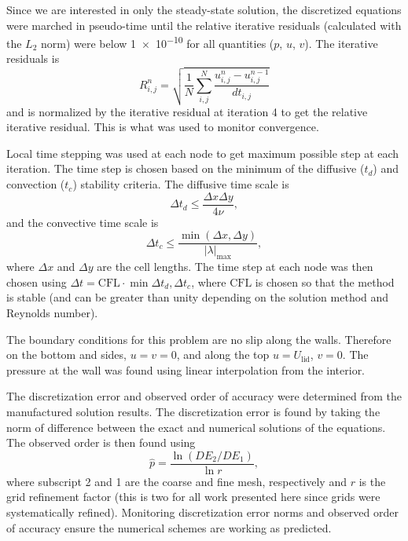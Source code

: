 \documentclass[10pt, letterpaper]{article}
\begin{document}
Since we are interested in only the steady-state solution, the discretized equations
were marched in pseudo-time until the relative iterative residuals (calculated
with the $L_2$ norm) were below \num{1e-10} for all quantities ($p$, $u$, $v$).
The iterative residuals is
%
\begin{equation} \label{eqn:resid}
	R_{i,j}^n = \sqrt{\frac{1}{N} \sum_{i,j}^N 
		\frac{u_{i,j}^n - u_{i,j}^{n-1}}{dt_{i,j}}}
\end{equation}
%
and is normalized by the iterative residual at iteration 4 to get the relative
iterative residual.  This is what was used to monitor convergence.

Local time stepping was used at each node to get maximum possible step at
each iteration.  The time step is chosen based on the minimum of the
diffusive ($t_d$) and convection ($t_c$) stability criteria.  The diffusive
time scale is
%
\begin{equation*}
	\Delta t_d \leq \frac{\Delta x \Delta y}{4 \nu},
\end{equation*}
%
and the convective time scale is
\begin{equation*}
	\Delta t_c \leq \frac{\min(\Delta x, \Delta y)}{|\lambda|_\mathrm{max}},
\end{equation*}
%
where $\Delta x$ and $\Delta y$ are the cell lengths.  The time step at each node
was then chosen using $\Delta	 t = \mathrm{CFL} \cdot \min{\Delta t_d, \Delta t_c}$,
where $\mathrm{CFL}$ is chosen so that the method is stable (and can be greater
than unity depending on the solution method and Reynolds number).

The boundary conditions for this problem are no slip along the walls.  Therefore
on the bottom and sides, $u=v=0$, and along the top $u=U_\mathrm{lid}$, $v=0$.
The pressure at the wall was found using linear interpolation from the
interior.

The discretization error and observed order of accuracy were determined from
the manufactured solution results.  The discretization error is found by
taking the norm of difference between the exact and numerical solutions of
the equations.  The observed order is then found using
%
\begin{equation} \label{eqn:ooa}
	\hat{p} = \frac{\ln(DE_2/DE_1)}{\ln r},
\end{equation}
%
where subscript 2 and 1 are the coarse and fine mesh, respectively and $r$
is the grid refinement factor (this is two for all work presented here since
grids were systematically refined).  Monitoring discretization error norms
and observed order of accuracy ensure the numerical schemes are working as
predicted.
\end{document}
